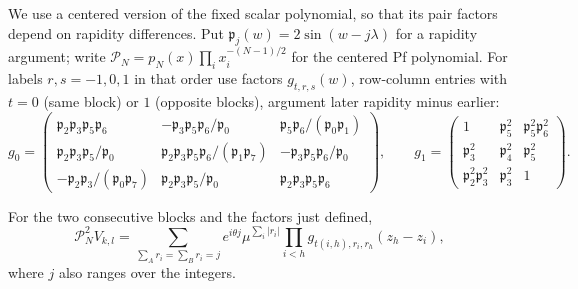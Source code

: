We use a centered version of the fixed scalar polynomial, so that its
pair factors depend on rapidity differences. Put \(\mathfrak p_j(w)=2\sin(w-j\lambda)\) for a rapidity argument; write \(\mathcal P_N=p_N(x)\prod_i x_i^{-(N-1)/2}\) for the centered Pf polynomial. For labels \(r,s=-1,0,1\) in that order use factors \(g_{t,r,s}(w)\), row-column entries with \(t=0\) (same block) or \(1\) (opposite blocks), argument later rapidity minus earlier:
\[
 g_0=
 \begin{pmatrix}
 \mathfrak p_2\mathfrak p_3\mathfrak p_5\mathfrak p_6&-\mathfrak p_3\mathfrak p_5\mathfrak p_6/\mathfrak p_0&\mathfrak p_5\mathfrak p_6/(\mathfrak p_0\mathfrak p_1)\\
 \mathfrak p_2\mathfrak p_3\mathfrak p_5/\mathfrak p_0&\mathfrak p_2\mathfrak p_3\mathfrak p_5\mathfrak p_6/(\mathfrak p_1\mathfrak p_7)&-\mathfrak p_3\mathfrak p_5\mathfrak p_6/\mathfrak p_0\\
 -\mathfrak p_2\mathfrak p_3/(\mathfrak p_0\mathfrak p_7)&\mathfrak p_2\mathfrak p_3\mathfrak p_5/\mathfrak p_0&\mathfrak p_2\mathfrak p_3\mathfrak p_5\mathfrak p_6
 \end{pmatrix},\qquad
 g_1=
 \begin{pmatrix}
 1&\mathfrak p_5^2&\mathfrak p_5^2\mathfrak p_6^2\\
 \mathfrak p_3^2&\mathfrak p_4^2&\mathfrak p_5^2\\
 \mathfrak p_2^2\mathfrak p_3^2&\mathfrak p_3^2&1
 \end{pmatrix}.
\]
\begin{proposition}
\label{c2:prop-scalar-gas}
For the two consecutive blocks and the factors just defined,
\begin{equation}
 \mathcal P_N^2 V_{k,l}=
 \sum_{\sum_A r_i=\sum_B r_i=j}
 e^{i\theta j}\mu^{\sum_i |r_i|}
 \prod_{i<h}g_{t(i,h),r_i,r_h}(z_h-z_i),                                \label{c2:eq-24}
\end{equation}
where \(j\) also ranges over the integers.
\end{proposition}

